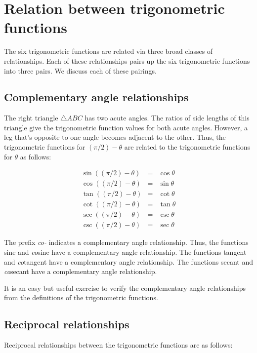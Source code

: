 \documentclass{amsart}
\begin{document}
\section{Relation between trigonometric functions}

The six trigonometric functions are related via three broad classes of
relationships. Each of these relationships pairs up the six
trigonometric functions into three pairs. We discuss each of these
pairings.

\subsection{Complementary angle relationships}

The right triangle $\triangle ABC$ has two acute angles. The ratios of
side lengths of this triangle give the trigonometric function values
for both acute angles. However, a leg that's opposite to one angle
becomes adjacent to the other. Thus, the trigonometric functions for
$(\pi/2) - \theta$ are related to the trigonometric functions for
$\theta$ as follows:

\begin{eqnarray*}
  \sin((\pi/2) - \theta) & = & \cos \theta\\
  \cos((\pi/2) - \theta) & = & \sin \theta\\
  \tan((\pi/2) - \theta) & = & \cot \theta\\
  \cot((\pi/2) - \theta) & = & \tan \theta\\
  \sec((\pi/2) - \theta) & = & \csc \theta\\
  \csc((\pi/2) - \theta) & = & \sec \theta
\end{eqnarray*}

The prefix {\em co-} indicates a complementary angle
relationship. Thus, the functions sine and {\em co}sine have a
complementary angle relationship. The functions tangent and {\em
co}tangent have a complementary angle relationship. The functions
secant and {\em co}secant have a complementary angle relationship.

It is an easy but useful exercise to verify the complementary angle
relationships from the definitions of the trigonometric functions.

\subsection{Reciprocal relationships}

Reciprocal relationships between the trigonometric functions are as follows:
\end{document}
